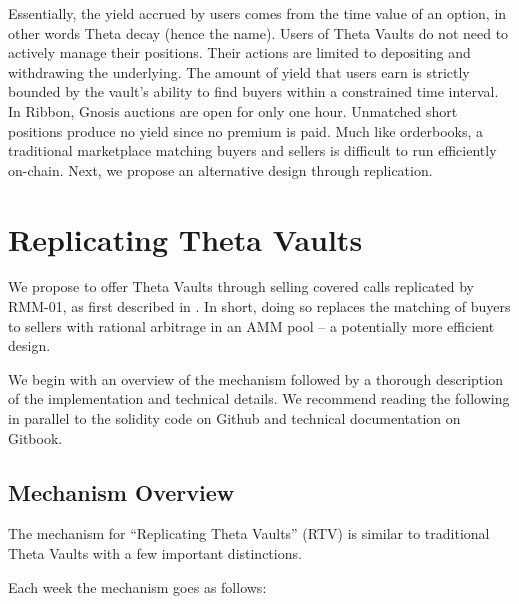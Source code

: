\documentclass[hidelinks, 12pt]{article}
\begin{document}
Essentially, the yield accrued by users comes from the time value of an option, in other words Theta decay (hence the name). Users of Theta Vaults do not need to actively manage their positions. Their actions are limited to depositing and withdrawing the underlying. The amount of yield that users earn is strictly bounded by the vault's ability to find buyers within a constrained time interval. In Ribbon, Gnosis auctions are open for only one hour. Unmatched short positions produce no yield since no premium is paid. Much like orderbooks, a traditional marketplace matching buyers and sellers is difficult to run efficiently on-chain. Next, we propose an alternative design through replication.

\section{Replicating Theta Vaults}

We propose to offer Theta Vaults through selling covered calls replicated by RMM-01, as first described in \cite{sterrett2022replicating}. In short, doing so replaces the matching of buyers to sellers with rational arbitrage in an AMM pool -- a potentially more efficient design.

We begin with an overview of the mechanism followed by a thorough description of the implementation and technical details. We recommend reading the following in parallel to the solidity code on Github and technical documentation on Gitbook.

\subsection{Mechanism Overview}

The mechanism for ``Replicating Theta Vaults'' (RTV) is similar to traditional Theta Vaults with a few important distinctions.


Each week the mechanism goes as follows:
\end{document}

